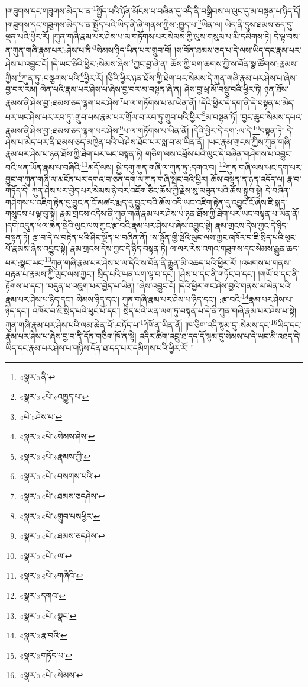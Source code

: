 །གཟུགས་དང་གཟུགས་མེད་པ་ན་\footnote{«སྣར་»ནི་}སྤྱོད་པའི་ཉོན་མོངས་པ་བཞིན་དུ་འདི་ནི་བསྒྲིབས་ལ་ལུང་དུ་མ་བསྟན་པ་ཉིད་དོ། །གཟུགས་དང་གཟུགས་མེད་པ་ན་སྤྱོད་པའི་ཡིད་ནི་ཞི་གནས་ཀྱིས་:ཁྱུད་པ་\footnote{«སྣར་»«པེ་»འཁྱུད་པ་}ཡིན་ལ། ཡིད་ནི་དུས་ཐམས་ཅད་དུ་ལྡན་པའི་ཕྱིར་རོ། །ཀུན་གཞི་རྣམ་པར་ཤེས་པ་མ་གཏོགས་པར་སེམས་ཀྱི་ལུས་གསུམ་པ་མི་དམིགས་ཏེ། དེ་ལྟ་བས་ན་ཀུན་གཞི་རྣམ་པར་:ཤེས་པ་ནི་\footnote{«པེ་»ཤེས་པ་}སེམས་ཉིད་ཡིན་པར་གྲུབ་བོ། །ས་བོན་ཐམས་ཅད་པ་དེ་ལས་ཡིད་དང་རྣམ་པར་ཤེས་པ་འབྱུང་ངོ། །དེ་ཡང་ཅིའི་ཕྱིར་:སེམས་ཞེས་\footnote{«སྣར་»«པེ་»སེམས་ཤེས་}ཀྱང་བྱ་ཞེ་ན། ཆོས་ཀྱི་བག་ཆགས་ཀྱི་ས་བོན་སྣ་ཚོགས་:རྣམས་ཀྱིས་\footnote{«སྣར་»«པེ་»རྣམས་ཀྱི་}ཀུན་ཏུ་:བསྩགས་པའི་\footnote{«སྣར་»«པེ་»བསགས་པའི་}ཕྱིར་རོ། །ཅིའི་ཕྱིར་ཉན་ཐོས་ཀྱི་ཐེག་པར་སེམས་དེ་ཀུན་གཞི་རྣམ་པར་ཤེས་པ་ཞེས་བྱ་བར་རམ། ལེན་པའི་རྣམ་པར་ཤེས་པ་ཞེས་བྱ་བར་མ་བསྟན་ཞེ་ན། ཤེས་བྱ་ཕྲ་མོ་བསྡུ་བའི་ཕྱིར་ཏེ། ཉན་ཐོས་རྣམས་ནི་ཤེས་བྱ་:ཐམས་ཅད་ལྷག་པར་ཤེས་\footnote{«སྣར་»«པེ་»ཐམས་ཅདཤེས་}པ་ལ་གཏོགས་པ་མ་ཡིན་ནོ། །དེའི་ཕྱིར་དེ་དག་ནི་དེ་བསྟན་པ་མེད་པར་ཡང་ཤེས་པར་རབ་ཏུ་:གྲུབ་པས་རྣམ་པར་གྲོལ་བ་རབ་ཏུ་གྲུབ་པའི་ཕྱིར་\footnote{«སྣར་»«པེ་»གྲུབ་པསཕྱིར་}མ་བསྟན་ཏོ། །བྱང་ཆུབ་སེམས་དཔའ་རྣམས་ནི་ཤེས་བྱ་:ཐམས་ཅད་ལྷག་པར་ཤེས་\footnote{«སྣར་»«པེ་»ཐམས་ཅདཤེས་}པ་ལ་གཏོགས་པ་ཡིན་ནོ། །དེའི་ཕྱིར་དེ་དག་:ལ་དེ་\footnote{«སྣར་»«པེ་»ལ་}བསྟན་ཏེ། དེ་ཤེས་པ་མེད་པར་ནི་ཐམས་ཅད་མཁྱེན་པའི་ཡེ་ཤེས་ཐོབ་པར་སླ་བ་མ་ཡིན་ནོ། །ཡང་རྣམ་གྲངས་ཀྱིས་ཀུན་གཞི་རྣམ་པར་ཤེས་པ་ཉན་ཐོས་ཀྱི་ཐེག་པར་ཡང་བསྟན་ཏེ། གཅིག་ལས་འཕྲོས་པའི་ལུང་དེ་བཞིན་གཤེགས་པ་འབྱུང་བའི་ཕན་ཡོན་རྣམ་པ་བཞིའི་\footnote{«སྣར་»«པེ་»གཞིའི་}མདོ་ལས། སྐྱེ་དགུ་ཀུན་གཞི་ལ་ཀུན་ཏུ་:དགའ་བ། \footnote{«སྣར་»དགའ་}ཀུན་གཞི་ལས་ཡང་དག་པར་བྱུང་བ་ཀུན་གཞི་ལ་མངོན་པར་དགའ་བ་ཅན་དག་ལ་ཀུན་གཞི་སྤང་བའི་ཕྱིར། ཆོས་བསྟན་ན་ཉན་འདོད་ལ། རྣ་བ་གཏོད་དེ། ཀུན་ཤེས་པར་བྱེད་པར་སེམས་ཉེ་བར་འཇོག་ཅིང་ཆོས་ཀྱི་རྗེས་སུ་མཐུན་པའི་ཆོས་སྒྲུབ་སྟེ། དེ་བཞིན་གཤེགས་པ་འཇིག་རྟེན་དུ་བྱུང་ན་ངོ་མཚར་རྨད་དུ་བྱུང་བའི་ཆོས་འདི་ཡང་འཇིག་རྟེན་དུ་འབྱུང་ངོ་ཞེས་ཇི་སྐད་གསུངས་པ་ལྟ་བུ་སྟེ། རྣམ་གྲངས་འདིས་ནི་ཀུན་གཞི་རྣམ་པར་ཤེས་པ་ཉན་ཐོས་ཀྱི་ཐེག་པར་ཡང་བསྟན་པ་ཡིན་ནོ། །དགེ་འདུན་ཕལ་ཆེན་སྡེའི་ལུང་ལས་ཀྱང་རྩ་བའི་རྣམ་པར་ཤེས་པ་ཞེས་འབྱུང་སྟེ། རྣམ་གྲངས་དེས་ཀྱང་དེ་ཉིད་བསྟན་ཏེ། རྩ་བ་དེ་ལ་བརྟེན་པའི་ཤིང་ལྗོན་པ་བཞིན་ནོ། །ས་སྟོན་གྱི་སྡེའི་ལུང་ལས་ཀྱང་འཁོར་བ་ཇི་སྲིད་པའི་ཕུང་པོ་རྣམས་ཞེས་འབྱུང་སྟེ། རྣམ་གྲངས་དེས་ཀྱང་དེ་ཉིད་བསྟན་ཏེ། ལ་ལར་རེས་འགའ་གཟུགས་དང་སེམས་རྒྱུན་ཆད་པར་:སྣང་ཡང་\footnote{«སྣར་»«པེ་»སྣང་}ཀུན་གཞི་རྣམ་པར་ཤེས་པ་ལ་དེའི་ས་བོན་ནི་རྒྱུན་མི་འཆད་པའི་ཕྱིར་རོ། །འཕགས་པ་གནས་བརྟན་པ་རྣམས་ཀྱི་ལུང་ལས་ཀྱང་། སྲིད་པའི་ཡན་ལག་ལྟ་བ་དང་། །ཤེས་པ་དང་ནི་གཏོང་བ་དང་། །གཡོ་བ་དང་ནི་རྟོགས་པ་དང་། །བདུན་པ་འཇུག་པར་བྱེད་པ་ཡིན། །ཞེས་འབྱུང་ངོ། །དེའི་ཕྱིར་གང་ཤེས་བྱའི་གནས་ལ་ལེན་པའི་རྣམ་པར་ཤེས་པ་ཉིད་དང་། སེམས་ཉིད་དང་། ཀུན་གཞི་རྣམ་པར་ཤེས་པ་ཉིད་དང་། :རྩ་བའི་\footnote{«སྣར་»རྣ་བའི་}རྣམ་པར་ཤེས་པ་ཉིད་དང་། འཁོར་བ་ཇི་སྲིད་པའི་ཕུང་པོ་དང་། སྲིད་པའི་ཡན་ལག་ཏུ་བསྟན་པ་དེ་ནི་ཀུན་གཞི་རྣམ་པར་ཤེས་པ་སྟེ། ཀུན་གཞི་རྣམ་པར་ཤེས་པའི་ལམ་ཆེན་པོ་:བཏོད་པ་\footnote{«སྣར་»གཏོད་པ་}ཁོ་ན་ཡིན་ནོ། །ཁ་ཅིག་འདི་སྙམ་དུ་:སེམས་དང་\footnote{«སྣར་»«པེ་»སེམས་}ཡིད་དང་རྣམ་པར་ཤེས་པ་ཞེས་བྱ་བ་ནི་དོན་གཅིག་ཁོ་ན་སྟེ། འདིར་ཚིག་འབྲུ་ཐ་དད་དོ་སྙམ་དུ་སེམས་པ་དེ་ཡང་མི་འཐད་དེ། ཡིད་དང་རྣམ་པར་ཤེས་པ་གཉིས་དོན་ཐ་དད་པར་དམིགས་པའི་ཕྱིར་རོ། །
